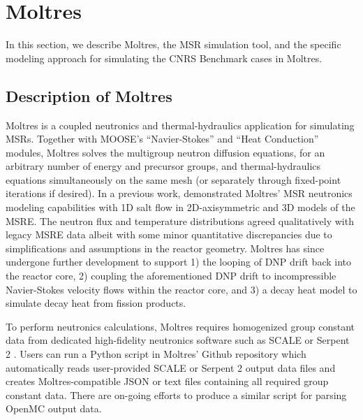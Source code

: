 \section{Moltres} \label{sec:moltres}

In this section, we describe Moltres, the \gls{MSR} simulation tool, and
the specific modeling approach for simulating the CNRS Benchmark cases in
Moltres.

\subsection{Description of Moltres} \label{sec:description-of-moltres}

Moltres is a coupled neutronics and thermal-hydraulics application for
simulating \glspl{MSR}. Together with \gls{MOOSE}'s ``Navier-Stokes'' and
``Heat Conduction'' modules, Moltres solves the multigroup neutron diffusion
equations, for an arbitrary number of energy and precursor groups, and
thermal-hydraulics equations simultaneously on the same mesh (or separately
through fixed-point iterations if desired).
In a previous work, \cite{lindsay_introduction_2018}
demonstrated Moltres' \gls{MSR} neutronics modeling capabilities with 1D salt
flow in 2D-axisymmetric and 3D models of the \gls{MSRE}. The neutron flux and
temperature distributions agreed qualitatively with legacy
\gls{MSRE} data albeit with some minor quantitative discrepancies due to
simplifications and assumptions in the reactor geometry. Moltres has
since undergone further development to support 1) the looping of \gls{DNP}
drift back into the reactor core, 2) coupling the aforementioned \gls{DNP}
drift to incompressible Navier-Stokes velocity flows within the reactor core,
and 3) a decay heat model to simulate decay heat from fission products.

To perform neutronics calculations, Moltres requires homogenized group constant
data from dedicated high-fidelity neutronics software such as SCALE
\citep{dehart_reactor_2011} or Serpent 2 \citep{leppanen_serpent_2014}. Users
can run a Python script in Moltres' Github repository which automatically reads
user-provided SCALE or Serpent 2 output data files and creates
Moltres-compatible JSON or text files containing all required group constant
data. There are on-going efforts to produce a similar script for parsing OpenMC
output data.

